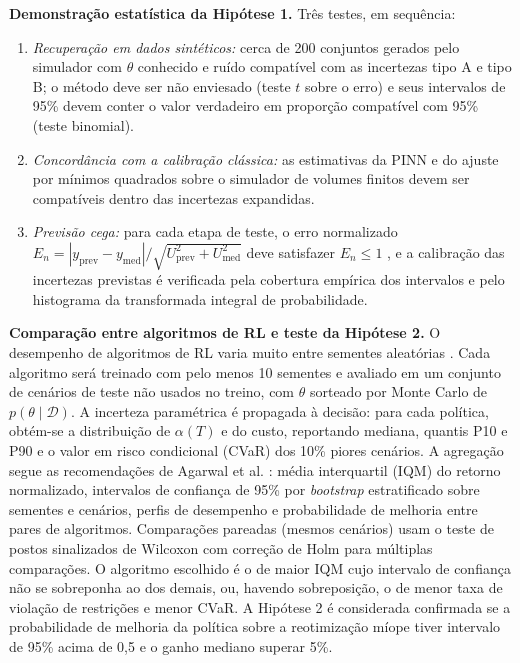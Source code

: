 \documentclass[10pt,a4paper]{article}
\begin{document}
\textbf{Demonstração estatística da Hipótese 1.} Três testes, em sequência:
\begin{enumerate}[label=(\roman*)]
  \item \textit{Recuperação em dados sintéticos:} cerca de 200 conjuntos gerados pelo simulador
        com $\theta$ conhecido e ruído compatível com as incertezas tipo A e tipo B; o
        método deve ser não enviesado (teste $t$ sobre o erro) e seus intervalos de 95\% devem
        conter o valor verdadeiro em proporção compatível com 95\% (teste binomial).
  \item \textit{Concordância com a calibração clássica:} as estimativas da PINN e do ajuste por
        mínimos quadrados sobre o simulador de volumes finitos devem ser compatíveis dentro
        das incertezas expandidas.
  \item \textit{Previsão cega:} para cada etapa de teste, o erro normalizado
        $E_n = |y_{\mathrm{prev}} - y_{\mathrm{med}}| \big/ \sqrt{U_{\mathrm{prev}}^2 + U_{\mathrm{med}}^2}$
        deve satisfazer $E_n \le 1$ \cite{iso13528}, e a calibração das incertezas
        previstas é verificada pela cobertura empírica dos intervalos e pelo histograma da
        transformada integral de probabilidade.
\end{enumerate}

\textbf{Comparação entre algoritmos de RL e teste da Hipótese 2.} O desempenho de algoritmos de RL
varia muito entre sementes aleatórias \cite{henderson2018}. Cada algoritmo será treinado
com pelo menos 10 sementes e avaliado em um conjunto de cenários de teste não
usados no treino, com $\theta$ sorteado por Monte Carlo de $p(\theta\mid\mathcal{D})$. A
incerteza paramétrica é propagada à decisão: para cada política, obtém-se a distribuição
de $\alpha(T)$ e do custo, reportando mediana, quantis P10 e P90 e o valor em risco
condicional (CVaR) dos 10\% piores cenários. A agregação segue as recomendações de Agarwal
et al. \cite{agarwal2021}: média interquartil (IQM) do retorno normalizado, intervalos de
confiança de 95\% por \textit{bootstrap} estratificado sobre sementes e cenários, perfis
de desempenho e probabilidade de melhoria entre pares de algoritmos. Comparações pareadas
(mesmos cenários) usam o teste de postos sinalizados de Wilcoxon \cite{wilcoxon1945}
com correção de Holm \cite{holm1979} para múltiplas comparações. O algoritmo escolhido é o de maior IQM cujo intervalo de confiança
não se sobreponha ao dos demais, ou, havendo sobreposição, o de menor taxa de violação de
restrições e menor CVaR. A Hipótese 2 é considerada confirmada se a probabilidade de melhoria da
política sobre a reotimização míope tiver intervalo de 95\% acima de 0,5 e o ganho mediano
superar 5\%.
\end{document}
